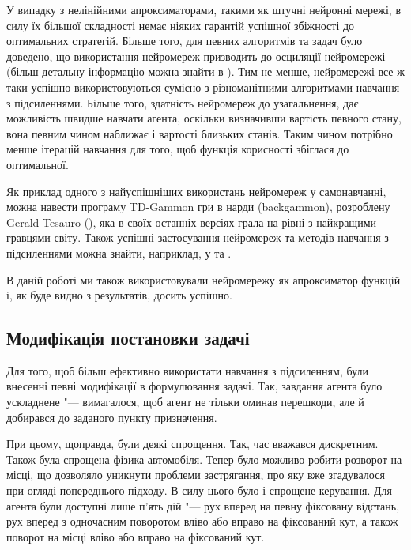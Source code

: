 \documentclass[a4paper,10pt,fleqn]{article}
\begin{document}
У випадку з нелінійними апроксиматорами, такими як штучні нейронні мережі, в силу їх більшої складності немає ніяких гарантій успішної збіжності до оптимальних стратегій. Більше того, для певних алгоритмів та задач було доведено, що використання нейромереж призводить до осциляції нейромережі (більш детальну інформацію можна знайти в \cite{SuttonBarto2002}). Тим не менше, нейромережі все ж таки успішно використовуються сумісно з різноманітними алгоритмами навчання з підсиленнями. Більше того, здатність нейромереж до узагальнення, дає можливість швидше навчати агента, оскільки визначивши вартість певного стану, вона певним чином наближає і вартості близьких станів. Таким чином потрібно менше ітерацій навчання для того, щоб функція корисності збіглася до оптимальної.

Як приклад одного з найуспішніших використань нейромереж у самонавчанні, можна навести програму TD-Gammon гри в нарди (backgammon), розроблену Gerald Tesauro (\cite{Tesauro1995}), яка в своїх останніх версіях грала на рівні з найкращими гравцями світу. Також успішні застосування нейромереж та методів навчання з підсиленнями можна знайти, наприклад, у \cite{Rummery1995} та \cite{Coulom2002}.

В даній роботі ми також використовували нейромережу як апроксиматор функцій і, як буде видно з результатів, досить успішно.

\subsection{Модифікація постановки задачі}

Для того, щоб більш ефективно використати навчання з підсиленням, були внесенні певні модифікації в формулювання задачі. Так, завдання агента було ускладнене "--- вимагалося, щоб агент не тільки оминав перешкоди, але й добирався до заданого пункту призначення.

При цьому, щоправда, були деякі спрощення. Так, час вважався дискретним. Також була спрощена фізика автомобіля. Тепер було можливо робити розворот на місці, що дозволяло уникнути проблеми застрягання, про яку вже згадувалося при огляді попереднього підходу. В силу цього було і спрощене керування. Для агента були доступні лише п'ять дій "--- рух вперед на певну фіксовану відстань, рух вперед з одночасним поворотом вліво або вправо на фіксований кут, а також поворот на місці вліво або вправо на фіксований кут. 
\end{document}
